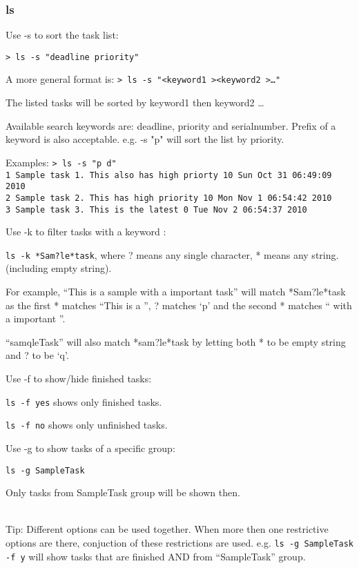 \documentclass[12pt, a4paper]{article}
\begin{document}
\subsubsection{ls}

Use -s to sort the task list:

\texttt{\textgreater \ ls -s "deadline priority"}

A more general format is:
\texttt{\textgreater \ ls -s "\textless keyword1 \textgreater \textless keyword2 \textgreater \ldots"}

The listed tasks will be sorted by keyword1 then keyword2 \ldots
    
Available search keywords are: deadline, priority and serialnumber. Prefix of a keyword is also acceptable. e.g. \textgreaterls -s "p" will sort the list by priority.

Examples:
\texttt{\textgreater \ ls -s "p d"\\
  1   Sample task 1. This also has high priorty   10  Sun Oct 31 06:49:09 2010\\
  2   Sample task 2. This has high priority       10  Mon Nov  1 06:54:42 2010\\
  3   Sample task 3. This is the latest           0   Tue Nov  2 06:54:37 2010}

Use -k to filter tasks with a keyword \footnotemark:

\texttt{ls -k *Sam?le*task}, where ? means any single character, * means any string. (including empty string).

For example, ``This is a sample with a important task'' will match *Sam?le*task as the first * matches ``This is a '', ? matches `p' and the second * matches `` with a important ''.

``samqleTask'' will also match *sam?le*task by letting both * to be empty string and ? to be `q'.

Use -f to show/hide finished tasks:

\texttt{ls -f yes} shows only finished tasks.

\texttt{ls -f no} shows only unfinished tasks.

Use -g to show tasks of a specific group:

\texttt{ls -g SampleTask}

Only tasks from SampleTask group will be shown then.

\\Tip: Different options can be used together.
When more then one restrictive options are there, conjuction of these restrictions are used.
e.g. \texttt{ls -g SampleTask -f y} will show tasks that are finished AND from ``SampleTask'' group. 
\end{document}
